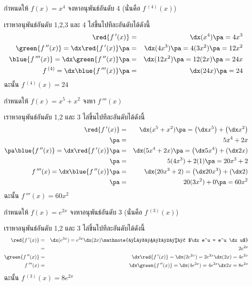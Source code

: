\begin{frame}[t]
\begin{ex}
กำหนดให้ $f(x) = x^4$ จงหาอนุพันธ์อันดับ 4 (นั่นคือ $f\,^{(4)}(x)$)
\end{ex}
\begin{sol} เราหาอนุพันธ์อันดับ 1,2,3 และ 4 ไล่ขึ้นไปทีละอันดับได้ดังนี้
\begin{eqnarray*}
\red{f\,'(x)} &=& \dx (x^4) \pa = 4x^3 \\
\green{f\,''(x)} = \dx \red{f\,'(x)} \pa &=& \dx (4x^3) \pa = 4(3x^2) \pa = 12x^2 \\
\blue{f\,'''(x)} = \dx \green{f\,''(x)} \pa &=& \dx (12x^2) \pa = 12(2x) \pa = 24x \\
f\,^{(4)} = \dx \blue{f\,'''(x)} \pa &=& \dx (24x) \pa = 24
\end{eqnarray*}
ฉะนั้น $f\,^{(4)}(x) = 24$
\end{sol}
\end{frame}


\begin{frame}[t]
\begin{ex}
กำหนดให้ $f(x) = x^5+x^2$ จงหา $f\,'''(x)$
\end{ex}
\begin{sol} เราหาอนุพันธ์อันดับ 1,2 และ 3 ไล่ขึ้นไปทีละอันดับได้ดังนี้
\begin{eqnarray*}
\red{f\,'(x)} &=& \dx (x^5 + x^2) \pa = \left( \dx x^5 \right) + \left( \dx x^2 \right)  \\
\pa &=& 5x^4 + 2x \\
\pa \blue{f\,''(x)} = \dx \red{f\,'(x)} \pa &=& \dx (5x^4 + 2x) \pa = \left( \dx 5x^4 \right) + \left( \dx 2x \right) \\
\pa &=& 5(4x^3) + 2(1) \pa = 20x^3 + 2 \\
f\,'''(x) = \dx \blue{f\,''(x)} \pa &=& \dx (20x^3 + 2) = \left( \dx 20x^3 \right) + \left( \dx 2 \right)\\
\pa &=& 20(3x^2) + 0 \pa = 60x^2
\end{eqnarray*}
ฉะนั้น $f\,'''(x) = 60x^2$
\end{sol}
\end{frame}


\begin{frame}[t]
\begin{ex}
กำหนดให้ $f(x) = e^{2x}$ จงหาอนุพันธ์อันดับ 3 (นั่นคือ $f\,^{(3)}(x)$)
\end{ex}
\begin{sol} เราหาอนุพันธ์อันดับ 1,2 และ 3 ไล่ขึ้นไปทีละอันดับได้ดังนี้
\begin{eqnarray*}
\red{f\,'(x)} &=& \dx (e^{2x})= e^{2x} \dx (2x) \mathnote{จากสูตร $\dx e^u = e^u \dx u$}\\
&=& 2e^{2x} \\
\green{f\,''(x)} &=& \dx \red{f\,'(x)} = \dx (2e^{2x}) = 2e^{2x} \dx (2x) = 4e^{2x} \\
f\,'''(x) &=& \dx \green{f\,''(x)} = \dx (4e^{2x}) = 4e^{2x} \dx 2x = 8e^{2x}
\end{eqnarray*}
ฉะนั้น $f\,^{(3)}(x) = 8e^{2x}$
\end{sol}
\end{frame}


